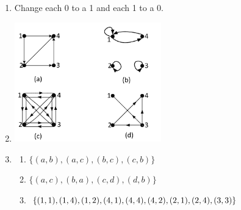 \documentclass{sig-alternate-05-2015}
\begin{document}
\begin{enumerate}
\item Change each 0
to a 1 and each 1 to a 0.

\item
	\includegraphics[width=0.5\textwidth]{figs/122.pdf}
	
\item
\begin{enumerate}
	\item $\{(a, b), (a, c), (b, c), (c, b)\}$
	\item $\{(a, c), (b, a), (c, d), (d, b)\}$
	\item $\{(1, 1), (1, 4), (1, 2), (4, 1), (4, 4),\\ (4, 2), (2, 1),
		(2, 4), (3, 3)\}$
\end{enumerate}

\end{enumerate}
\end{document}
